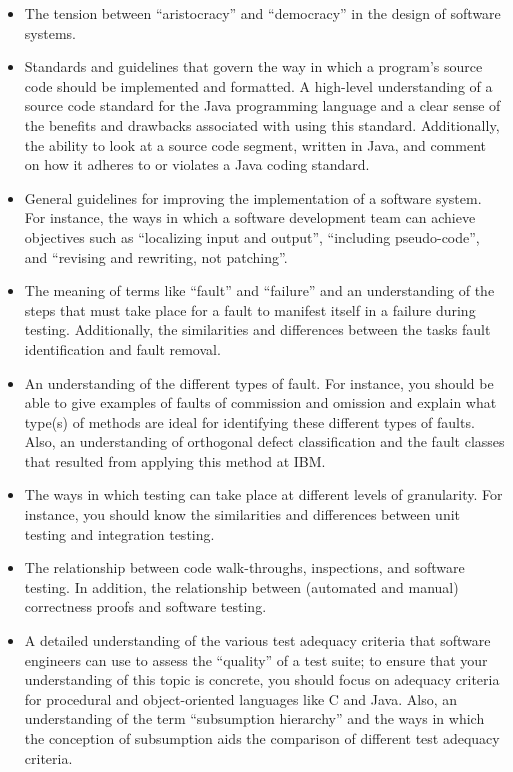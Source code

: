 \begin{itemize}
  \item The tension between ``aristocracy'' and ``democracy'' in the design of software systems.

  \item Standards and guidelines that govern the way in which a program's source code should be implemented and
    formatted. A high-level understanding of a source code standard for the Java programming language and a clear sense
    of the benefits and drawbacks associated with using this standard. Additionally, the ability to look at a source
    code segment, written in Java, and comment on how it adheres to or violates a Java coding standard.

  \item General guidelines for improving the implementation of a software system. For instance, the ways in which a
    software development team can achieve objectives such as ``localizing input and output'', ``including pseudo-code'',
    and ``revising and rewriting, not patching''.

  \item The meaning of terms like ``fault'' and ``failure'' and an understanding of the steps that must take place for a
    fault to manifest itself in a failure during testing. Additionally, the similarities and differences between the
    tasks fault identification and fault removal.

  \item An understanding of the different types of fault. For instance, you should be able to give examples of faults of
    commission and omission and explain what type(s) of methods are ideal for identifying these different types of
    faults. Also, an understanding of orthogonal defect classification and the fault classes that resulted from applying
    this method at IBM.

  \item The ways in which testing can take place at different levels of granularity. For instance, you should know the
    similarities and differences between unit testing and integration testing.

  \item The relationship between code walk-throughs, inspections, and software testing. In addition, the relationship
    between (automated and manual) correctness proofs and software testing.

  \item A detailed understanding of the various test adequacy criteria that software engineers can use to assess the
    ``quality'' of a test suite; to ensure that your understanding of this topic is concrete, you should focus on
    adequacy criteria for procedural and object-oriented languages like C and Java. Also, an understanding of the term
    ``subsumption hierarchy'' and the ways in which the conception of subsumption aids the comparison of different test
    adequacy criteria.


\end{itemize}
